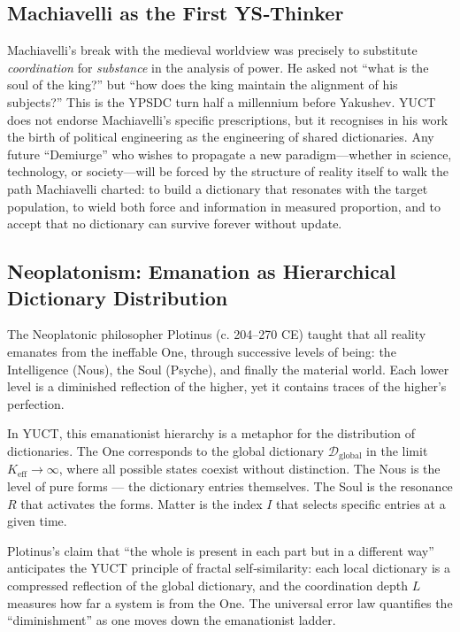 \documentclass[12pt,a4paper]{article}
\begin{document}
	\subsection{Machiavelli as the First YS‑Thinker}
	
	Machiavelli’s break with the medieval worldview was precisely to substitute \emph{coordination} for \emph{substance} in the analysis of power. He asked not ``what is the soul of the king?'' but ``how does the king maintain the alignment of his subjects?'' This is the YPSDC turn half a millennium before Yakushev. YUCT does not endorse Machiavelli’s specific prescriptions, but it recognises in his work the birth of political engineering as the engineering of shared dictionaries. Any future ``Demiurge'' who wishes to propagate a new paradigm---whether in science, technology, or society---will be forced by the structure of reality itself to walk the path Machiavelli charted: to build a dictionary that resonates with the target population, to wield both force and information in measured proportion, and to accept that no dictionary can survive forever without update.
	
	\subsection{Neoplatonism: Emanation as Hierarchical Dictionary Distribution}
	
	The Neoplatonic philosopher Plotinus (c. 204–270 CE) taught that all reality emanates from the ineffable One, through successive levels of being: the Intelligence (Nous), the Soul (Psyche), and finally the material world. Each lower level is a diminished reflection of the higher, yet it contains traces of the higher’s perfection.
	
	In YUCT, this emanationist hierarchy is a metaphor for the distribution of dictionaries. The One corresponds to the global dictionary \(\mathcal{D}_{\text{global}}\) in the limit \(K_{\mathrm{eff}} \to \infty\), where all possible states coexist without distinction. The Nous is the level of pure forms — the dictionary entries themselves. The Soul is the resonance \(R\) that activates the forms. Matter is the index \(I\) that selects specific entries at a given time.
	
	Plotinus’s claim that “the whole is present in each part but in a different way” anticipates the YUCT principle of fractal self‑similarity: each local dictionary is a compressed reflection of the global dictionary, and the coordination depth \(L\) measures how far a system is from the One. The universal error law quantifies the “diminishment” as one moves down the emanationist ladder.
	
\end{document}
